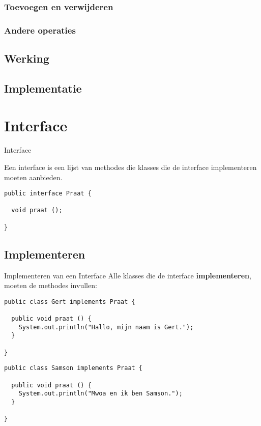 \documentclass[handout]{beamer}
\newcommand{\term}[1]{\textbf{#1}}
\begin{document}
\subsubsection{Toevoegen en verwijderen}
\subsubsection{Andere operaties}
\subsection{Werking}
\subsection{Implementatie}
\section{Interface}
\begin{frame}[fragile]{Interface}
\begin{definition}[Interface]
Een interface is een lijst van methodes die klasses die de interface implementeren moeten aanbieden.
\end{definition}
\begin{example}
\begin{lstlisting}
public interface Praat {

  void praat ();

}
\end{lstlisting}
\end{example}
\end{frame}
\subsection{Implementeren}
\begin{frame}[fragile]{Implementeren van een Interface}
Alle klasses die de interface \term{implementeren}, moeten de methodes invullen:
\begin{example}
\begin{lstlisting}
public class Gert implements Praat {

  public void praat () {
    System.out.println("Hallo, mijn naam is Gert.");
  }

}
\end{lstlisting}
\end{example}
\begin{example}
\small{\begin{lstlisting}
public class Samson implements Praat {

  public void praat () {
    System.out.println("Mwoa en ik ben Samson.");
  }

}
\end{lstlisting}}
\end{example}
\end{frame}
\end{document}
